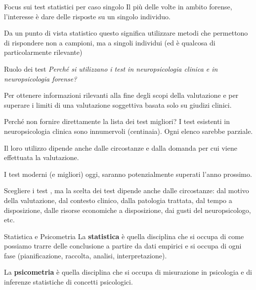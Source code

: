 \documentclass[
  ignorenonframetext,
]{beamer}
\begin{document}
\begin{frame}{Focus sui test statistici per caso singolo}
\label{focus-sui-test-statistici-per-caso-singolo}
Il più delle volte in ambito forense, l'interesse è dare delle risposte
su un singolo individuo.

Da un punto di vista statistico questo significa utilizzare metodi che
permettono di rispondere non a campioni, ma a singoli individui (ed è
qualcosa di particolarmente rilevante)
\end{frame}

\begin{frame}{Ruolo dei test}
\label{ruolo-dei-test}
\emph{Perché si utilizzano i test in neuropsicologia clinica e in
neuropsicologia forense?}

\pause

Per ottenere informazioni rilevanti alla fine degli scopi della
valutazione e per superare i limiti di una valutazione soggettiva basata
solo su giudizi clinici.
\end{frame}

\begin{frame}{Perché non fornire direttamente la lista dei test
migliori?}
\label{perchuxe9-non-fornire-direttamente-la-lista-dei-test-migliori}
I test esistenti in neuropsicologia clinica sono innumervoli
(centinaia). Ogni elenco sarebbe parziale.

Il loro utilizzo dipende anche dalle circostanze e dalla domanda per cui
viene effettuata la valutazione.

I test moderni (e migliori) oggi, saranno potenzialmente superati l'anno
prossimo.
\end{frame}

\begin{frame}{Scegliere i test}
\label{scegliere-i-test}
\setlength{\fboxrule}{1mm}
, ma la scelta dei test dipende anche  dalle circostanze: dal motivo della valutazione, dal contesto clinico, dalla patologia trattata, dal tempo a disposizione, dalle risorse economiche a disposizione, dai gusti del
neuropsicologo, etc.
\end{frame}

\begin{frame}{Statistica e Psicometria}
\label{statistica-e-psicometria}
La \textbf{statistica} è quella disciplina che si occupa di come
possiamo trarre delle conclusione a partire da dati empirici e si occupa
di ogni fase (pianificazione, raccolta, analisi, interpretazione).
\pause

La \textbf{psicometria} è quella disciplina che si occupa di misurazione
in psicologia e di inferenze statistiche di concetti psicologici.
\end{frame}
\end{document}
